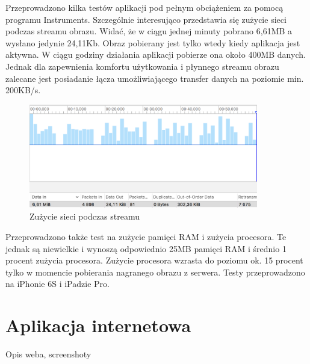 Przeprowadzono kilka testów aplikacji pod pełnym obciążeniem za pomocą programu Instruments. Szczególnie interesująco przedstawia się zużycie sieci podczas streamu obrazu. Widać, że w ciągu jednej minuty pobrano 6,61MB a wysłano jedynie 24,11Kb. Obraz pobierany jest tylko wtedy kiedy aplikacja jest aktywna. W ciągu godziny działania aplikacji pobierze ona około 400MB danych. Jednak dla zapewnienia komfortu użytkowania i płynnego streamu obrazu zalecane jest posiadanie łącza umożliwiającego transfer danych na poziomie min. 200KB/s. 
\begin{figure}[h]
	\centering
	\includegraphics[width=10cm]{networkUsage}
	\caption{Zużycie sieci podczas streamu}
\end{figure}
Przeprowadzono także test na zużycie pamięci RAM i zużycia procesora. Te jednak są niewielkie i wynoszą odpowiednio 25MB pamięci RAM i średnio 1 procent zużycia procesora.
Zużycie procesora wzrasta do poziomu ok. 15 procent tylko w momencie pobierania nagranego obrazu z serwera.
Testy przeprowadzono na iPhonie 6S i iPadzie Pro.




\section*{Aplikacja internetowa}

Opis weba, screenshoty